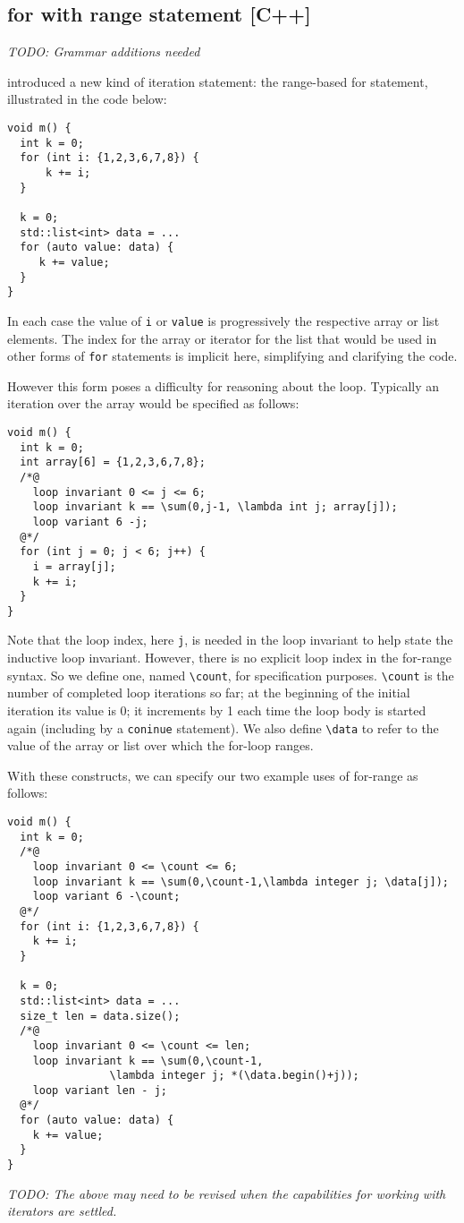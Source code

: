 \subsection{for with range statement [C++]}

\emph{TODO: Grammar additions needed}

\lang introduced a new kind of iteration statement: the range-based for statement, illustrated in the code below:
\begin{lstlisting}
void m() {
  int k = 0;
  for (int i: {1,2,3,6,7,8}) {
      k += i;
  }
  
  k = 0;
  std::list<int> data = ...
  for (auto value: data) {
     k += value;
  }
}
\end{lstlisting}

In each case the value of \lstinline|i| or \lstinline|value| is progressively the respective array or list elements. The  
index for the array or iterator for the list that would be used in other forms of \lstinline|for| statements is implicit here, simplifying and
clarifying the code.

However this form poses a difficulty for reasoning about the loop. Typically an iteration over the array would be specified as follows:
\begin{lstlisting}
void m() {
  int k = 0;
  int array[6] = {1,2,3,6,7,8};
  /*@
    loop invariant 0 <= j <= 6;
    loop invariant k == \sum(0,j-1, \lambda int j; array[j]);
    loop variant 6 -j;
  @*/
  for (int j = 0; j < 6; j++) {
    i = array[j];
    k += i;
  }
}
\end{lstlisting}

Note that the loop index, here \lstinline|j|, is needed in the loop invariant to help state the inductive loop invariant. However, there is no explicit loop index in the
for-range syntax. So we define one, named \lstinline|\count|, for specification purposes.
\lstinline|\count| is the number of completed loop iterations so far; 
at the beginning of the initial iteration its value is 0; it 
increments by 1 each time the loop body is started again (including by a
\lstinline|coninue| statement).
We also define \lstinline|\data| to refer to the value of the array or list over which the for-loop ranges.

With these constructs, we can specify our two example uses of for-range as follows:
\begin{lstlisting}
void m() {
  int k = 0;
  /*@
    loop invariant 0 <= \count <= 6;
    loop invariant k == \sum(0,\count-1,\lambda integer j; \data[j]);
    loop variant 6 -\count;
  @*/
  for (int i: {1,2,3,6,7,8}) {
    k += i;
  }

  k = 0;
  std::list<int> data = ...
  size_t len = data.size();
  /*@
    loop invariant 0 <= \count <= len;
    loop invariant k == \sum(0,\count-1,
                \lambda integer j; *(\data.begin()+j));
    loop variant len - j;
  @*/
  for (auto value: data) {
    k += value;
  }
}
\end{lstlisting}

\emph{TODO: The above may need to be revised when the capabilities for working with iterators are settled.}

